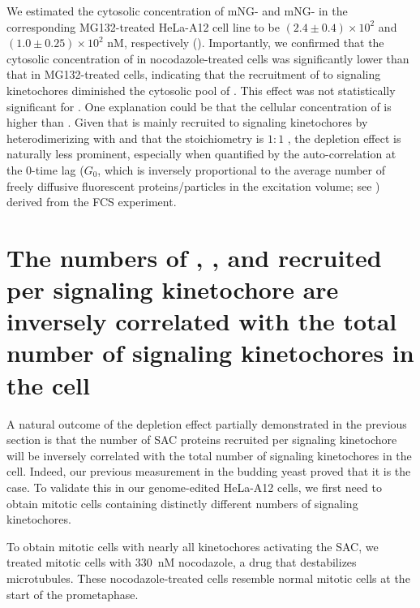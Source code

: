 We estimated the cytosolic concentration of mNG- and mNG- in the corresponding MG132-treated HeLa-A12 cell line to be $(2.4 \pm 0.4) \times 10^2$ and $(1.0 \pm 0.25) \times 10^2$ nM, respectively (). Importantly, we confirmed that the cytosolic concentration of  in nocodazole-treated cells was significantly lower than that in MG132-treated cells, indicating that the recruitment of  to signaling kinetochores diminished the cytosolic pool of . This effect was not statistically significant for . One explanation could be that the cellular concentration of  is higher than . Given that  is mainly recruited to signaling kinetochores by heterodimerizing with  and that the stoichiometry is $1:1$  \cite{BubBiochem}, the depletion effect is naturally less prominent, especially when quantified by the auto-correlation at the 0-time lag ($G_0$, which is inversely proportional to the average number of freely diffusive fluorescent proteins/particles in the excitation volume; see ) derived from the FCS experiment.


\section{The numbers of , , and  recruited per signaling kinetochore are inversely correlated with the total number of signaling kinetochores in the cell}

A natural outcome of the depletion effect partially demonstrated in the previous section is that the number of SAC proteins recruited per signaling kinetochore will be inversely correlated with the total number of signaling kinetochores in the cell. Indeed, our previous measurement in the budding yeast \cite{Aravamudhan2016} proved that it is the case. To validate this in our genome-edited HeLa-A12 cells, we first need to obtain mitotic cells containing distinctly different numbers of signaling kinetochores.

To obtain mitotic cells with nearly all kinetochores activating the SAC, we treated mitotic cells with \SI{330}{nM} nocodazole, a drug that destabilizes microtubules. These nocodazole-treated cells resemble normal mitotic cells at the start of the prometaphase.

